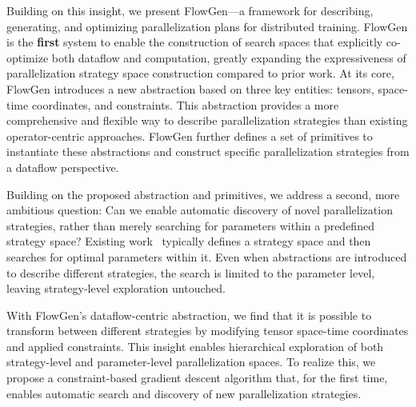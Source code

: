 Building on this insight, we present FlowGen—a framework for describing, generating, and optimizing parallelization plans for distributed training. FlowGen is the \textbf{first} system to enable the construction of search spaces that explicitly co-optimize both dataflow and computation, greatly expanding the expressiveness of parallelization strategy space construction compared to prior work. At its core, FlowGen introduces a new abstraction based on three key entities: tensors, space-time coordinates, and constraints. This abstraction provides a more comprehensive and flexible way to describe parallelization strategies than existing operator-centric approaches. FlowGen further defines a set of primitives to instantiate these abstractions and construct specific parallelization strategies from a dataflow perspective.

Building on the proposed abstraction and primitives, we address a second, more ambitious question: Can we enable automatic discovery of novel parallelization strategies, rather than merely searching for parameters within a predefined strategy space? Existing work~\cite{zheng2022alpa, tarnawski2021piper, liu2024aceso} typically defines a strategy space and then searches for optimal parameters within it. Even when abstractions are introduced to describe different strategies, the search is limited to the parameter level, leaving strategy-level exploration untouched.

With FlowGen's dataflow-centric abstraction, we find that it is possible to transform between different strategies by modifying tensor space-time coordinates and applied constraints. This insight enables hierarchical exploration of both strategy-level and parameter-level parallelization spaces. To realize this, we propose a constraint-based gradient descent algorithm that, for the first time, enables automatic search and discovery of new parallelization strategies.


